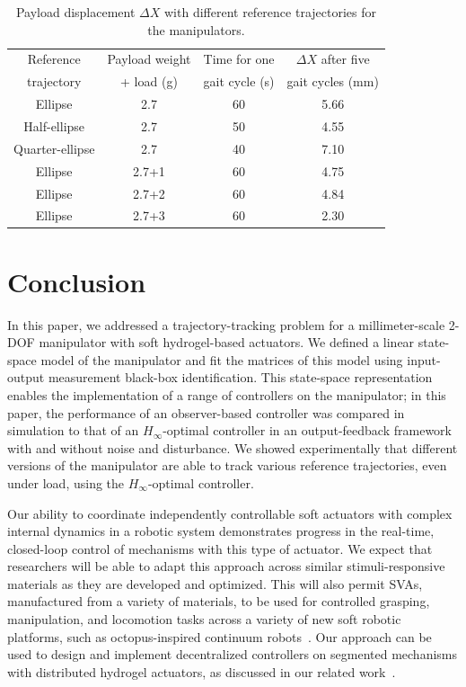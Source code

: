\begin{table}[t]
\centering
\caption{Payload displacement $\Delta X$ with different reference trajectories for the manipulators.}
\label{table:table_Payload displacement}
\begin{tabular}{c c c c}

\hline
Reference & Payload weight & Time for one & $\Delta X$ after five \\
trajectory & + load (g) & gait cycle (s) & gait cycles (mm)\\
\hline
Ellipse         & 2.7   & 60  & 5.66\\
Half-ellipse    & 2.7   & 50  & 4.55\\
Quarter-ellipse & 2.7   & 40  & 7.10\\
Ellipse         & 2.7+1 & 60  & 4.75\\
Ellipse         & 2.7+2 & 60  & 4.84\\
Ellipse         & 2.7+3 & 60  & 2.30\\
\hline
\end{tabular}
\end{table}

\section{Conclusion}

In this paper, we addressed a trajectory-tracking problem for a millimeter-scale 2-DOF manipulator with soft hydrogel-based actuators. We defined a linear state-space model of the manipulator and fit the matrices of this model using input-output measurement black-box identification. This state-space representation enables the implementation of a range of controllers on the manipulator; in this paper, the performance of an observer-based controller was compared in simulation to that of an $H_{\infty}$-optimal controller in an output-feedback framework with and without noise and disturbance. We showed experimentally that different versions of the manipulator are able to track various reference trajectories, even under load, using the $H_{\infty}$-optimal controller.

Our ability to coordinate independently controllable soft actuators with complex internal dynamics in a robotic system demonstrates progress in the real-time, closed-loop control of mechanisms with this type of actuator. We expect that researchers will be able to adapt this approach across similar stimuli-responsive materials as they are developed and optimized. This will also permit SVAs, manufactured from a variety of materials, to be used for controlled grasping, manipulation, and locomotion tasks across a variety of new soft robotic platforms, such as octopus-inspired continuum robots~\cite{doroudchi2020dynamic}. Our approach can be used to design and implement decentralized controllers on segmented mechanisms with distributed hydrogel actuators, as discussed in our related work~\cite{doroudchi2020dynamic,doroudchi2018decentralized}.

